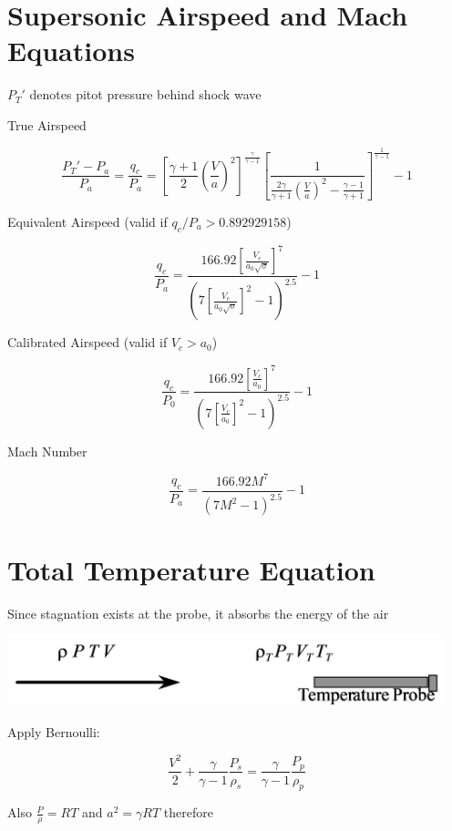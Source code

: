 \documentclass[
]{book}
\begin{document}
\hypertarget{supersonic-airspeed-and-mach-equations}{%
\section{Supersonic Airspeed and Mach Equations}\label{supersonic-airspeed-and-mach-equations}}

\(P_T'\) denotes pitot pressure behind shock wave

True Airspeed

\[ \frac{P_T' - P_a}{P_a} = \frac{q_c}{P_a} = \left[ \frac{\gamma + 1}{2} \left(  \frac{V}{a} \right)^2  \right]^\frac{\gamma}{\gamma-1} \left[ \frac{1}{ \frac{2\gamma}{\gamma+1} \left( \frac{V}{a} \right)^2 - \frac{\gamma-1}{\gamma+1} }  \right]^\frac{1}{\gamma-1} - 1 \]

Equivalent Airspeed (valid if \(q_c/P_a > 0.892 929 158\))

\[ \frac{q_c}{P_a} = \frac{166.92 \left[ \frac{V_e}{a_0 \sqrt{\sigma}} \right]^7} {\left( 7 \left[ \frac{V_e}{a_0 \sqrt{\sigma}} \right]^2 - 1 \right)^{2.5}} - 1 \]

Calibrated Airspeed (valid if \(V_c > a_0\))

\[ \frac{q_c}{P_0} = \frac{166.92 \left[ \frac{V_c}{a_0} \right]^7} {\left( 7 \left[ \frac{V_c}{a_0} \right]^2 - 1 \right)^{2.5}} - 1\]

Mach Number

\[ \frac{q_c}{P_a} = \frac{166.92 M^7} {\left( 7 M^2 - 1 \right)^{2.5}} -1 \]

\hypertarget{total-temperature-equation}{%
\section{Total Temperature Equation}\label{total-temperature-equation}}

Since stagnation exists at the probe, it absorbs the energy of the air

\includegraphics[width=5in,height=0.82in]{media/04/image13.png}

Apply Bernoulli:

\[ \frac{V^2}{2} + \frac{\gamma}{\gamma - 1}  \frac{P_s}{\rho_s} = \frac{\gamma}{\gamma - 1} \frac{P_p}{\rho_p} \]

Also \(\frac{P}{\rho} = RT\) and \(a^2 = \gamma RT\) therefore
\end{document}
